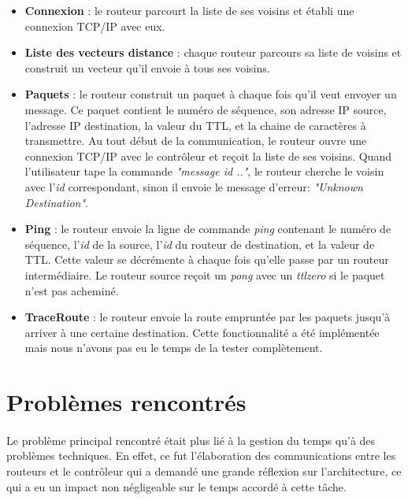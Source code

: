 \begin{itemize}
\item \textbf{Connexion} : le routeur parcourt la liste de ses voisins et établi une connexion TCP/IP avec eux.

\item \textbf{Liste des vecteurs distance} : chaque routeur parcours sa liste de voisins et construit un vecteur qu'il envoie à tous ses voisins.

\item \textbf{Paquets} : le routeur construit un paquet à chaque fois qu'il veut envoyer un message. Ce paquet contient le numéro de séquence, son adresse IP source, l'adresse IP destination, la valeur du TTL, et la chaine de caractères à transmettre. Au tout début de la communication, le routeur ouvre une connexion TCP/IP avec le contrôleur et reçoit la liste de ses voisins. Quand l'utilisateur tape la commande \textit{"message id .."}, le routeur cherche le voisin avec l'\textit{id} correspondant, sinon il envoie le message d'erreur: \textit{"Unknown Destination"}. 

\item \textbf{Ping} : le routeur envoie la ligne de commande \textit{ping} contenant le numéro de séquence, l'\textit{id} de la source, l'\textit{id} du routeur de destination, et la valeur de TTL. Cette valeur se décrémente à chaque fois qu'elle passe par un routeur intermédiaire. Le routeur source reçoit un \textit{pong} avec un \textit{ttlzero} si le paquet n'est pas acheminé.

\item \textbf{TraceRoute} : le routeur envoie la route empruntée par les paquets jusqu'à arriver à une certaine destination. Cette fonctionnalité a été implémentée mais nous n'avons pas eu le temps de la tester complètement.

\end{itemize}
\newpage
\section{Problèmes rencontrés}
\paragraph{}Le problème principal rencontré était plus lié à la gestion du temps qu'à des problèmes techniques. En effet, ce fut l'élaboration des communications entre les routeurs  et le contrôleur qui a demandé une grande réflexion sur l'architecture, ce qui a eu un impact non négligeable sur le temps accordé à cette tâche. 
